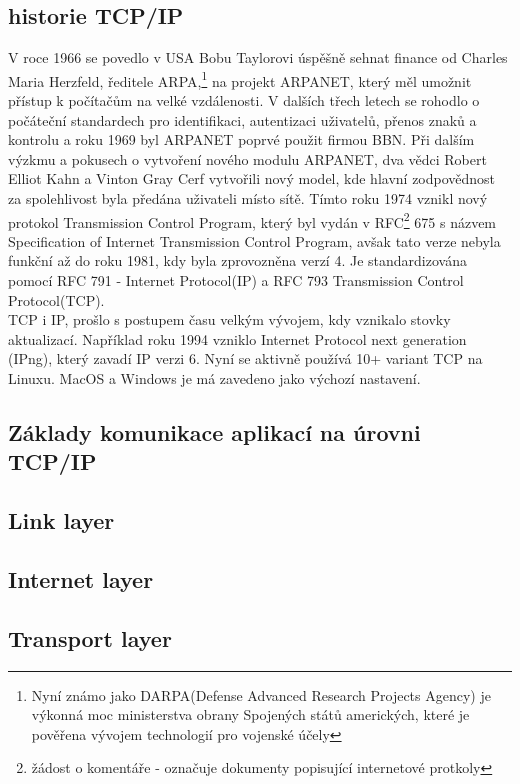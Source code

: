 \documentclass[12pt]{article}
\begin{document}
\subsection{historie TCP/IP}
V roce 1966 se povedlo v USA Bobu Taylorovi úspěšně sehnat finance od Charles Maria Herzfeld, ředitele ARPA,\footnote{Nyní známo jako DARPA(Defense Advanced Research Projects Agency) je výkonná moc ministerstva obrany Spojených států amerických, které je pověřena vývojem technologií pro vojenské účely} na projekt ARPANET, který měl umožnit přístup k počítačům na velké vzdálenosti. V dalších třech letech se rohodlo o počáteční standardech pro identifikaci, autentizaci uživatelů, přenos znaků a kontrolu a roku 1969 byl ARPANET poprvé použit firmou BBN. 
Při dalším výzkmu a pokusech o vytvoření nového modulu ARPANET, dva vědci Robert Elliot Kahn a Vinton Gray Cerf vytvořili nový model, kde hlavní zodpovědnost za spolehlivost byla předána uživateli místo sítě. Tímto roku 1974 vznikl nový protokol Transmission Control Program, který byl vydán v RFC\footnote{žádost o komentáře - označuje dokumenty popisující internetové protkoly} 675 s názvem Specification of Internet Transmission Control Program, avšak tato verze nebyla funkční až do roku 1981, kdy byla zprovozněna verzí 4. Je standardizována pomocí RFC 791 - Internet Protocol(IP) a RFC 793 Transmission Control Protocol(TCP). 
\\
TCP i IP, prošlo s postupem času velkým vývojem, kdy vznikalo stovky aktualizací. Například roku 1994 vzniklo Internet Protocol next generation (IPng), který zavadí IP verzi 6. Nyní se aktivně používá 10+ variant TCP na Linuxu. MacOS a Windows je má zavedeno jako výchozí nastavení. 

\subsection{Základy komunikace aplikací na úrovni TCP/IP}

\subsection{Link layer}

\subsection{Internet layer}

\subsection{Transport layer}
\end{document}
